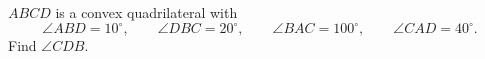 $ABCD$ is a convex quadrilateral with
\[
\angle ABD=10^\circ,\qquad \angle DBC=20^\circ,\qquad \angle BAC=100^\circ,\qquad \angle CAD=40^\circ .
\]
Find $\angle CDB$.

